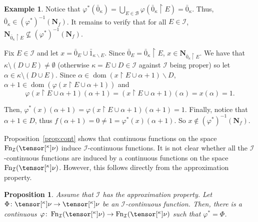 \documentclass{amsart}
\numberwithin{equation}{section}
\newcommand{\B}{\mathcal{B}}
\newcommand{\I}{\mathcal{I}}
\newcommand{\pre}[2]{\tensor[^{#1}]{#2}{}}
\newcommand{\Nbhd}{\boldsymbol{N}}
\newcommand{\1}{\mathbf{I}}
\newcommand{\2}{\mathbf{II}}
\renewcommand{\a}{\alpha}
\renewcommand{\k}{\kappa}
\renewcommand{\phi}{\varphi}
\DeclareMathOperator{\dom}{dom}
\DeclareMathOperator{\Fn}{Fn}
\newtheorem{proposition}[theorem]{Proposition}
\theoremstyle{definition}
\newtheorem{example}[theorem]{Example}
\theoremstyle{remark}
\begin{document}
\begin{example}
Notice that $\varphi^*(\bar0_\k)=\bigcup_{E \in \B} \varphi(\bar0_\k \restriction E)=\bar0_\k$. Thus, $\bar0_\k\in (\phi^*)^{-1}(\Nbhd_f)$.
It remains to verify that for all $E\in \I$, $\Nbhd_{\bar0_\k\restriction E}\not\subseteq (\phi^*)^{-1}(\Nbhd_f)$. 

Fix $E\in \I$ and let $x=\bar0_E\cup \bar1_{\k\backslash E}$. Since $\bar0_E=\bar0_\k\restriction E$, $x\in \Nbhd_{\bar0_\k\restriction E}$.  
We have that $\k \setminus (D \cup E)\neq \emptyset$ (otherwise $\k=E\cup D\in \I$ against \(\I\) being proper) so let $\a\in \k \setminus (D \cup E)$. 
Since $\alpha\in \dom (x\restriction E\cup {\alpha+1})\backslash D$, $\alpha+1\in \dom (\varphi(x\restriction E\cup {\alpha+1}))$ and 
\[
\varphi(x\restriction E\cup {\alpha+1})(\alpha+1)=(x\restriction E\cup {\alpha+1})(\alpha)=x(\a)=1.
\]

 Then, 
 \(\varphi^*(x)(\alpha+1)=\phi(x\restriction E\cup {\alpha+1} )(\a+1)=1 \).
Finally, notice that $\alpha+1\in D$, thus $f(\alpha+1)=0\neq 1=\varphi^*(x)(\alpha+1)$. So $x\notin (\phi^*)^{-1}(\Nbhd_f)$.
\end{example}



Proposition~\ref{prop:cont} shows that continuous functions on the space $\Fn_\I( \pre{\k}{\nu} )$ induce \(\I\)-continuous functions. It is not clear whether all the \(\I\)-continuous functions are induced by a continuous functions on the space $\Fn_\I( \pre{\k}{\nu} )$. However, this follows directly from the approximation property.

\begin{proposition}\label{prop:approx}
Assume that \(\I\) has the approximation property. Let  $\Phi \colon \pre{\k}{\nu}  \to \pre{\k}{\nu}$ be an \(\I\)-continuous function. Then, there is a continuous $\varphi \colon \Fn_\I( \pre{\k}{\nu} ) \to \Fn_\I( \pre{\k}{\nu} ) $ such that $\varphi^* = \Phi$. 
\end{proposition}
\end{document}
